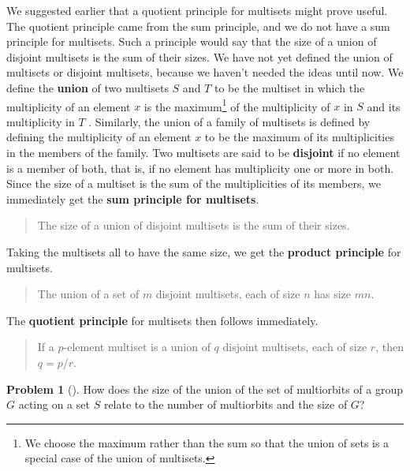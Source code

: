 \documentclass[10pt,]{book}
\newcommand{\terminology}[1]{\textbf{#1}}
\theoremstyle{plain}
\theoremstyle{definition}
\newtheorem{activity}[project]{Problem}
\theoremstyle{definition}
\numberwithin{equation}{chapter}
\begin{document}
\hypertarget{p-1675}{}%
We suggested earlier that a quotient principle for multisets might prove useful. The quotient principle came from the sum principle, and we do not have a sum principle for multisets. Such a principle would say that the size of a union of disjoint multisets is the sum of their sizes. We have not yet defined the union of multisets or disjoint multisets, because we haven't needed the ideas until now. We define the \terminology{union} of two multisets \(S\) and \(T\) to be the multiset in which the multiplicity of an element \(x\) is the maximum\footnote{We choose the maximum rather than the sum so that the union of sets is a special case of the union of multisets.\label{fn-23}} of the multiplicity of \(x\) in \(S\) and its multiplicity in \(T\) . Similarly, the union of a family of multisets is defined by defining the multiplicity of an element \(x\) to be the maximum of its multiplicities in the members of the family. Two multisets are said to be \terminology{disjoint} if no element is a member of both, that is, if no element has multiplicity one or more in both. Since the size of a multiset is the sum of the multiplicities of its members, we immediately get the \terminology{sum principle for multisets}.%
\begin{quote}\hypertarget{blockquote-16}{}
\hypertarget{p-1676}{}%
The size of a union of disjoint multisets is the sum of their sizes. %
\end{quote}
\hypertarget{p-1677}{}%
Taking the multisets all to have the same size, we get the \terminology{product principle} for multisets. %
\begin{quote}\hypertarget{blockquote-17}{}
\hypertarget{p-1678}{}%
The union of a set of \(m\) disjoint multisets, each of size \(n\) has size \(mn\).%
\end{quote}
\hypertarget{p-1679}{}%
The \terminology{quotient principle} for multisets then follows immediately.%
\begin{quote}\hypertarget{blockquote-18}{}
\hypertarget{p-1680}{}%
If a \(p\)-element multiset is a union of \(q\) disjoint multisets, each of size \(r\), then \(q = p/r\).%
\end{quote}
\begin{activity}[] \label{union-multiorbit-size}
\hypertarget{p-1681}{}%
How does the size of the union of the set of multiorbits of a group \(G\) acting on a set \(S\) relate to the number of multiorbits and the size of \(G\)?%
\end{activity}
\end{document}
